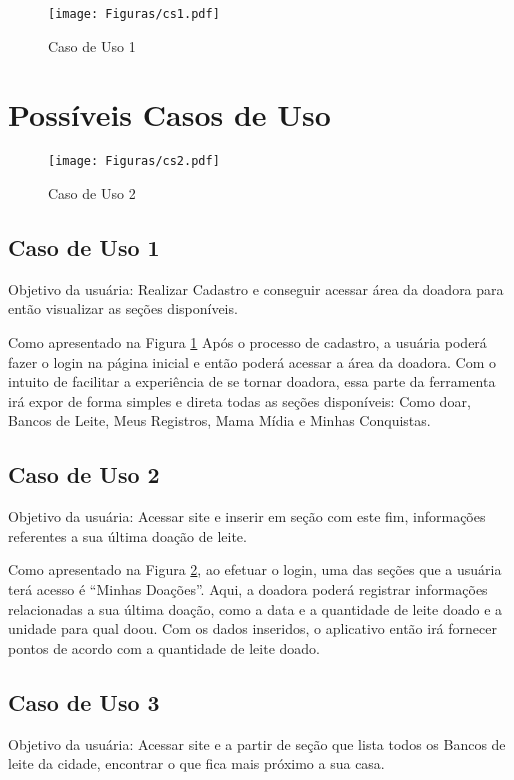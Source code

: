 \begin{figure}[h!]
    \centering
    \texttt{[image: Figuras/cs1.pdf]}
    \caption{Caso de Uso 1}
    \label{fig:cs1}
\end{figure} 

\section{Possíveis Casos de Uso}

\begin{figure}[h!]
    \centering
    \texttt{[image: Figuras/cs2.pdf]}
    \caption{Caso de Uso 2}
    \label{fig:cs2}
\end{figure}

\subsection{Caso de Uso 1}
Objetivo da usuária: Realizar Cadastro e conseguir acessar área da doadora para então visualizar as seções disponíveis.

Como apresentado na Figura \ref{fig:cs1} Após o processo de cadastro, a usuária poderá fazer o login na página inicial e então poderá acessar a área da doadora. Com o intuito de facilitar a experiência de se tornar doadora, essa parte da ferramenta irá expor de forma simples e direta todas as seções disponíveis: Como doar, Bancos de Leite, Meus Registros, Mama Mídia e Minhas Conquistas. 

\subsection{Caso de Uso 2}
Objetivo da usuária: Acessar site e inserir em seção com este fim, informações referentes a sua última doação de leite.

Como apresentado na Figura \ref{fig:cs2}, ao efetuar o login, uma das seções que a usuária terá acesso é “Minhas Doações”. Aqui, a doadora poderá registrar informações relacionadas a sua última doação, como a data e a quantidade de leite doado e a unidade para qual doou. Com os dados inseridos, o aplicativo então irá fornecer pontos de acordo com a quantidade de leite doado.

\subsection{Caso de Uso 3}
Objetivo da usuária: Acessar site e a partir de seção que lista todos os Bancos de leite da cidade, encontrar o que fica mais próximo a sua casa.

